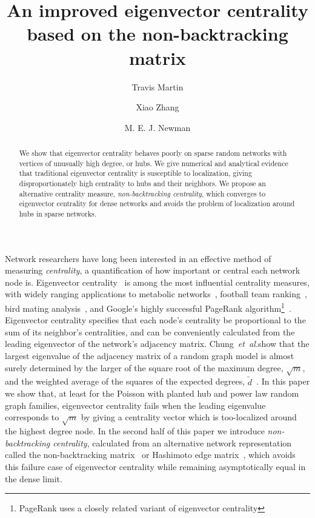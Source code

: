 \documentclass[twocolumn,prl,superscriptaddress]{revtex4}
\newcommand{\etal}{{\it{}et~al.}}
\begin{document}
\title{An improved eigenvector centrality based on the non-backtracking matrix}
\author{Travis Martin}
\author{Xiao Zhang}
\author{M. E. J. Newman}

\begin{abstract}
  We show that eigenvector centrality behaves poorly on sparse random networks with vertices of unusually high degree, or hubs. We give numerical and analytical evidence that traditional eigenvector centrality is susceptible to localization, giving disproportionately high centrality to hubs and their neighbors. We propose an alternative centrality measure, \emph{non-backtracking centrality}, which converges to eigenvector centrality for dense networks and avoids the problem of localization around hubs in sparse networks.
\end{abstract}

\maketitle

Network researchers have long been interested in an effective method of measuring \emph{centrality}, a quantification of how important or central each network node is. Eigenvector centrality~\cite{bonacich72} is among the most influential centrality measures, with widely ranging applications to metabolic networks~\cite{ding10}, football team ranking~\cite{keener93}, bird mating analysis~\cite{ryder08}, and Google's highly successful PageRank algorithm\footnote{PageRank uses a closely related variant of eigenvector centrality}~\cite{page99}. Eigenvector centrality specifies that each node's centrality be proportional to the sum of its neighbor's centralities, and can be conveniently calculated from the leading eigenvector of the network's adjacency matrix. Chung~\etal show that the largest eigenvalue of the adjacency matrix of a random graph model is almost surely determined by the larger of the square root of the maximum degree, $\sqrt{m}$, and the weighted average of the squares of the expected degrees, $\tilde{d}$~\cite{chung03}. In this paper we show that, at least for the Poisson with planted hub and power law random graph families, eigenvector centrality fails when the leading eigenvalue corresponds to $\sqrt{m}$ by giving a centrality vector which is too-localized around the highest degree node. In the second half of this paper we introduce \emph{non-backtracking centrality}, calculated from an alternative network representation called the non-backtracking matrix~\cite{krzakala13} or Hashimoto edge matrix~\cite{hashimoto89}, which avoids this failure case of eigenvector centrality while remaining asymptotically equal in the dense limit.
\end{document}
